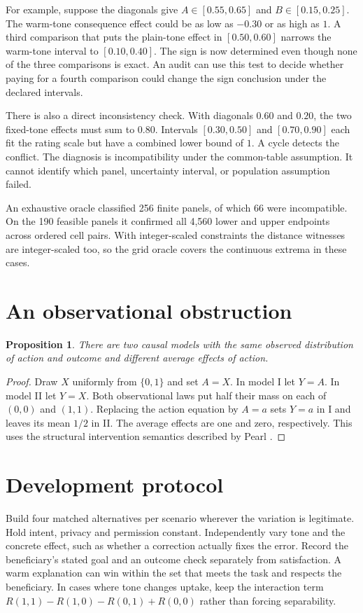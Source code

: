 \documentclass[11pt]{article}
\newtheorem{proposition}{Proposition}
\begin{document}
For example, suppose the diagonals give $A\in[0.55,0.65]$ and
$B\in[0.15,0.25]$. The warm-tone consequence effect could be as
low as $-0.30$ or as high as $1$. A third comparison that puts
the plain-tone effect in $[0.50,0.60]$ narrows the warm-tone
interval to $[0.10,0.40]$. The sign is now determined even though
none of the three comparisons is exact. An audit can use this test
to decide whether paying for a fourth comparison could change the
sign conclusion under the declared intervals.

There is also a direct inconsistency check. With diagonals $0.60$
and $0.20$, the two fixed-tone effects must sum to $0.80$.
Intervals $[0.30,0.50]$ and $[0.70,0.90]$ each fit the rating
scale but have a combined lower bound of $1$. A cycle detects the
conflict. The diagnosis is incompatibility under the common-table
assumption. It cannot identify which panel, uncertainty interval,
or population assumption failed.

An exhaustive oracle classified 256 finite panels, of which 66
were incompatible. On the 190 feasible panels it confirmed all
4,560 lower and upper endpoints across ordered cell pairs. With
integer-scaled constraints the distance witnesses are integer-scaled
too, so the grid oracle covers the continuous extrema in these cases.

\section{An observational obstruction}
\begin{proposition}
There are two causal models with the same observed distribution of
action and outcome and different average effects of action.
\end{proposition}
\begin{proof}
Draw $X$ uniformly from $\{0,1\}$ and set $A=X$. In model I let $Y=A$.
In model II let $Y=X$. Both observational laws put half their mass on
each of $(0,0)$ and $(1,1)$. Replacing the action equation by $A=a$
sets $Y=a$ in I and leaves its mean $1/2$ in II. The average effects
are one and zero, respectively. This uses the structural intervention
semantics described by Pearl \cite{pearl}.
\end{proof}

\section{Development protocol}
Build four matched alternatives per scenario wherever the variation is
legitimate. Hold intent, privacy and permission constant. Independently
vary tone and the concrete effect, such as whether a correction
actually fixes the error. Record the beneficiary's stated goal and an
outcome check separately from satisfaction. A warm explanation can
win within the set that meets the task and respects the beneficiary.
In cases where tone changes uptake, keep the interaction term
$R(1,1)-R(1,0)-R(0,1)+R(0,0)$ rather than forcing separability.
\end{document}
